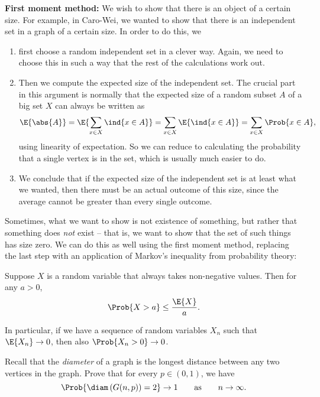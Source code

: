 \documentclass[nobib]{tufte-handout}
\begin{document}
\textbf{First moment method:} We wish to show that there is an object of a certain size. For example, in Caro-Wei, we wanted to show that there is an independent set in a graph of a certain size. In order to do this, we
\begin{enumerate}
  \item first choose a random independent set in a clever way. Again, we need to choose this in such a way that the rest of the calculations work out.
  \item Then we compute the expected size of the independent set. The crucial part in this argument is normally that the expected size of a random subset $A$ of a big set $X$ can always be written as
  $$\E{\abs{A}} = \E{\sum_{x \in X} \ind{x \in A}} = \sum_{x \in X} \E{\ind{x \in A}} = \sum_{x\in X} \Prob{x \in A},$$
  using linearity of expectation. So we can reduce to calculating the probability that a single vertex is in the set, which is usually much easier to do.
  \item We conclude that if the expected size of the independent set is at least what we wanted, then there must be an actual outcome of this size, since the average cannot be greater than every single outcome.
\end{enumerate}

Sometimes, what we want to show is not existence of something, but rather that something does \emph{not} exist -- that is, we want to show that the set of such things has size zero. We can do this as well using the first moment method, replacing the last step with an application of Markov's inequality from probability theory:

\begin{lemma}
  Suppose $X$ is a random variable that always takes non-negative values. Then for any $a > 0$,
  $$\Prob{X > a} \leq \frac{\E{X}}{a}.$$

  In particular, if we have a sequence of random variables $X_n$ such that $\E{X_n} \to 0$, then also $\Prob{X_n > 0} \to 0$.
\end{lemma}

\begin{xca}
  Recall that the \emph{diameter} of a graph is the longest distance between any two vertices in the graph. Prove that for every $p \in (0,1)$, we have
  $$\Prob{\diam\left(G(n,p)\right) = 2} \to 1\qquad \text{as}\qquad n \to \infty.$$
\end{xca}
\end{document}
